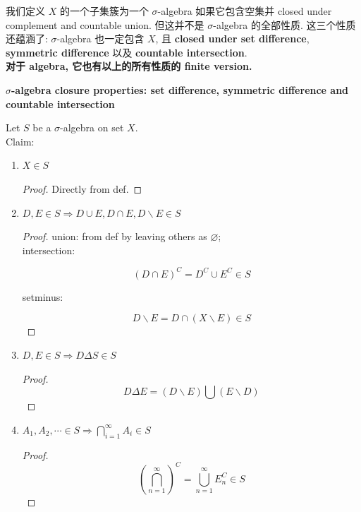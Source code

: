\documentclass{qlnotes-export}
\begin{document}
我们定义 \(X\) 的一个子集簇为一个 \(\sigma\)-algebra 如果它包含空集并 closed under complement and countable union. 但这并不是 \(\sigma\)-algebra 的全部性质. 这三个性质还蕴涵了: \(\sigma\)-algebra 也一定包含 \(X\), 且 \textbf{closed under set difference}, \textbf{symmetric difference} 以及 \textbf{countable intersection}.\\
\textbf{对于 algebra, 它也有以上的所有性质的 finite version.}

\begin{theorem}{\protect{}\label{kn-sigma-algebra-closure-properties}{\textbf{\(\sigma\)-algebra
closure properties: set difference, symmetric difference and countable
intersection}}}

Let \(S\) be a \(\sigma\)-algebra on set \(X\).\\
Claim:

\begin{enumerate}
\item
  \(X \in S\)

  \begin{proof}

  Directly from def.

  \end{proof}
\item
  \(D,E \in S\Longrightarrow D \cup E,D \cap E,D\backslash E \in S\)

  \begin{proof}

  union: from def by leaving others as \(\varnothing\);\\
  intersection:

  \[(D \cap E)^{C} = D^{C} \cup E^{C} \in S\]

  setminus:

  \[D\backslash E = D \cap (X\backslash E) \in S\]

  \end{proof}
\item
  \(D,E \in S\Longrightarrow D\Delta S \in S\)

  \begin{proof}

  \[D\Delta E = (D\backslash E)\bigcup(E\backslash D)\]

  \end{proof}
\item
  \(A_{1},A_{2},\cdots \in S\Longrightarrow\bigcap_{i = 1}^{\infty}A_{i} \in S\)

  \begin{proof}

  \[(\bigcap\limits_{n = 1}^{\infty})^{C} = \bigcup\limits_{n = 1}^{\infty}E_{n}^{C} \in S\]

  \end{proof}
\end{enumerate}

\end{theorem}
\end{document}
